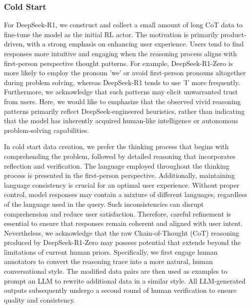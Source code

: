 \subsubsection{\dsri{} Cold Start} \label{sec:cold-start-reason}

For DeepSeek-R1, we construct and collect a small amount of long CoT data to fine-tune the model as the initial RL actor. The motivation is primarily product-driven, with a strong emphasis on enhancing user experience. Users tend to find responses more intuitive and engaging when the reasoning process aligns with first-person perspective thought patterns. For example, DeepSeek-R1-Zero is more likely to employ the pronoun 'we' or avoid first-person pronouns altogether during problem solving, whereas DeepSeek-R1 tends to use 'I' more frequently. Furthermore, we acknowledge that such patterns may elicit unwarranted trust from users. Here, we would like to emphasize that the observed vivid reasoning patterns primarily reflect DeepSeek-engineered heuristics, rather than indicating that the model has inherently acquired human-like intelligence or autonomous problem-solving capabilities.


In cold start data creation, we prefer the thinking process that begins with comprehending the problem, followed by detailed reasoning that incorporates reflection and verification. The language employed throughout the thinking process is presented in the first-person perspective.   Additionally, maintaining language consistency is crucial for an optimal user experience. Without proper control, model responses may contain a mixture of different languages, regardless of the language used in the query. Such inconsistencies can disrupt comprehension and reduce user satisfaction. Therefore, careful refinement is essential to ensure that responses remain coherent and aligned with user intent. Nevertheless, we acknowledge that the raw Chain-of-Thought (CoT) reasoning produced by DeepSeek-R1-Zero may possess potential that extends beyond the limitations of current human priors.
Specifically, we first engage human annotators to convert the reasoning trace into a more natural, human conversational style. The modified data pairs are then used as examples to prompt an LLM to rewrite additional data in a similar style. All LLM-generated outputs subsequently undergo a second round of human verification to ensure quality and consistency.

